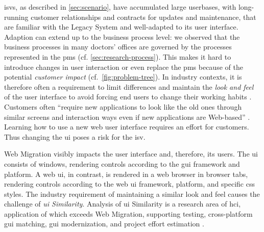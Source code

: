 \glspl{isv}, as described in \cref{sec:scenario}, have accumulated large userbases, with long-running customer relationships and contracts for updates and maintenance, that are familiar with the \gls{Legacy System} and well-adapted to its  user interface.
Adaption can extend up to the business process level: we observed that the business processes in many doctors' offices are governed by the processes represented in the \gls{pms} (cf. \cref{sec:research-process}).
This makes it hard to introduce changes in user interaction or even replace the \gls{pms} because of the potential \emph{customer impact} (cf.~\cref{fig:problem-tree}).
In industry contexts, it is therefore often a requirement to limit differences and maintain the \emph{look and feel} of the  user interface to avoid forcing end users to change their working habits \autocite{Lucia2008,Lucia2006,Distante2002}.
Customers often ``require new applications to look like the old ones through similar screens and interaction ways even if new applications are Web-based'' \autocite{Remics2013RecoverToolkit}.
Learning how to use a new \gls{web} user interface requires an effort for customers.%
Thus changing the \gls{ui} poses a risk for the \gls{isv}. %

\gls{Web Migration} visibly impacts the user interface and, therefore, its users.
The  \gls{ui} consists of windows, rendering controls according to the  \gls{gui} framework and platform. %
A \gls{web} \gls{ui}, in contrast, is rendered in a \gls{web} browser in browser tabs, rendering controls according to the \gls{web} \gls{ui} framework, platform, and specific \gls{css} styles.
The industry requirement of maintaining a similar look and feel causes the challenge of \emph{\gls{ui} Similarity}.
Analysis of \gls{ui} Similarity is a research area of \gls{hci}, application of which exceeds \gls{Web Migration}, supporting testing, cross-platform \gls{gui} matching, \gls{gui} modernization, and project effort estimation \autocite{Grechanik2018}.


